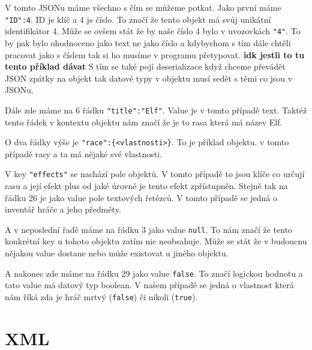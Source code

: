 V tomto JSONu máme všechno s čím se můžeme potkat. Jako první máme \verb|"ID":4|. ID je klíč a 4 je číslo. To značí že tento objekt má svůj unikátní identifikátor 4. Může se ovšem stát že by naše číslo 4 bylo v uvozovkách \verb|"4"|. To by pak bylo ohodnoceno jako text ne jako číslo a kdybychom s tím dále chtěli pracovat jako s číslem tak si ho musíme v programu přetypovat. \textbf{idk jestli to tu tento příklad dávat } S tím se také pojí deserializace když chceme převádět JSON zpátky na objekt tak datové typy v objektu musí sedět s těmi co jsou v JSONu.

Dále zde máme na 6 řádku \verb|"title":"Elf"|. Value je v tomto případě text. Taktéž tento řádek v kontextu objektu nám značí že je to rasa která má název Elf.

O dva řádky výše je \verb|"race":{<vlastnosti>}|. To je příklad objektu. v tomto případě rasy a ta má nějaké své vlastnosti.

V key \texttt{"effects"} se nachází pole objektů. V tomto případě to jsou klíče co určují rasu a její efekt plus od jaké úrovně je tento efekt zpřístupněn. Stejně tak na řádku 26 je jako value pole textových řetězců. V tomto případě se jedná o inventář hráče a jeho předměty.

A v neposlední řadě máme na řádku 3 jako value \texttt{null}. To nám značí že tento konkrétní key u tohoto objektu zatím nic neobsahuje. Může se stát že v budoucnu nějakou value dostane nebo může existovat u jiného objektu.

A nakonec zde máme na řádku 29 jako value \texttt{false}. To značí logickou hodnotu a tato value má datový typ boolean. V našem případě se jedná o vlastnost která nám říká zda je hráč mrtvý (\texttt{false}) či nikoli (\texttt{true}).


\section{XML}


\endinput